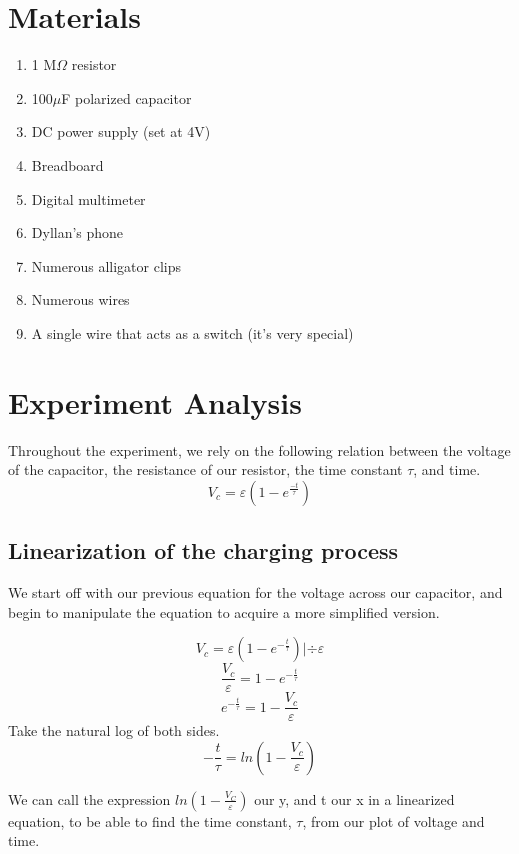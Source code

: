 \documentclass[titlepage]{article}
\begin{document}
    \section{Materials} 
    \begin{enumerate} 
        \item 1 M$\Omega$ resistor
        \item 100$\mu$F polarized capacitor
        \item DC power supply (set at 4V)
        \item Breadboard
        \item Digital multimeter
        \item Dyllan's phone
        \item Numerous alligator clips
        \item Numerous wires 
        \item A single wire that acts as a switch (it's very special)
    \end{enumerate} 


	\section{Experiment Analysis}
    Throughout the experiment, we rely on the following relation between the voltage of the capacitor, the resistance of our resistor, the time constant $\tau$, and time. 
    $$ V_c = \varepsilon (1-e^\frac{-t}{\tau})$$




    \subsection{Linearization of the charging process}
    We start off with our previous equation for the voltage across our capacitor, and begin to manipulate the equation to acquire a more simplified version.

    $$V_c = \varepsilon \left( 1- e^{-\frac{t}{\tau}} \right)  | \div \varepsilon  $$
    $$ \frac{V_c}{\varepsilon}= 1-e^{-\frac{t}{\tau}} $$
    $$ e^{-\frac{t}{\tau}} = 1-\frac{V_c}{\varepsilon} $$
    Take the natural log of both sides.
    $$ -\frac{t}{\tau} = ln\left( 1-\frac{V_c}{\varepsilon}  \right) $$

    We can call the expression $ln(1-\frac{V_C}{\varepsilon})$ our y, and t our x in a linearized equation, to be able to find the time constant, $\tau$, from our plot of voltage and time.  


    
\end{document}
